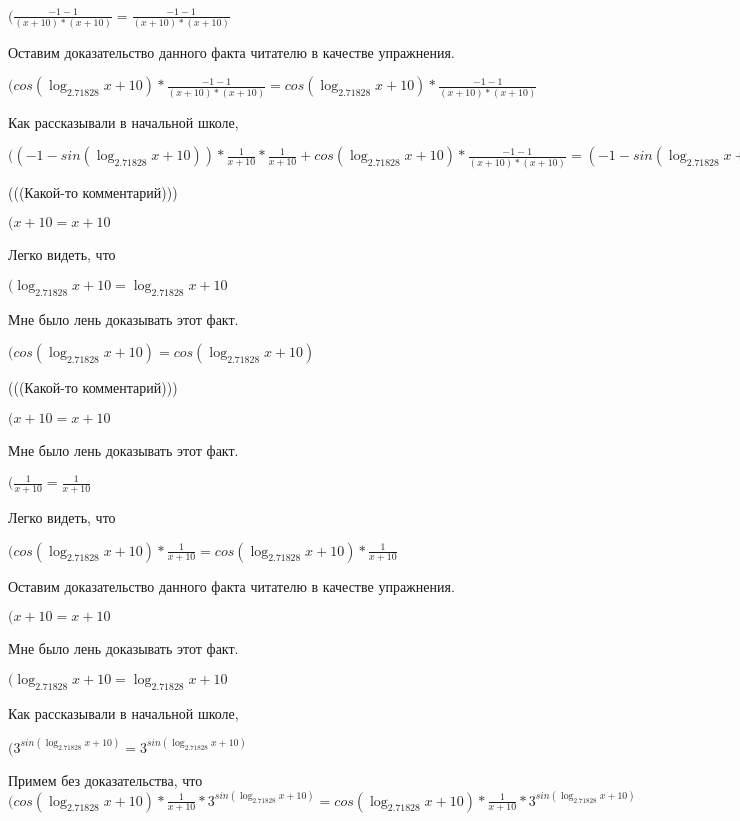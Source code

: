 \documentclass[12pt,a4paper,fleqn]{article}
\theoremstyle{definition}
\begin{document}
$(\frac{ -1  -  1 }{( x  +  10 ) * ( x  +  10 )}
 = \frac{ -1  -  1 }{( x  +  10 ) * ( x  +  10 )}
$

Оставим доказательство данного факта читателю в качестве упражнения.

$(cos(\log_{ 2.71828 }{ x  +  10 }) * \frac{ -1  -  1 }{( x  +  10 ) * ( x  +  10 )}
 = cos(\log_{ 2.71828 }{ x  +  10 }) * \frac{ -1  -  1 }{( x  +  10 ) * ( x  +  10 )}
$

Как рассказывали в начальной школе,

$(( -1  - sin(\log_{ 2.71828 }{ x  +  10 })) * \frac{ 1 }{ x  +  10 }
 * \frac{ 1 }{ x  +  10 }
 + cos(\log_{ 2.71828 }{ x  +  10 }) * \frac{ -1  -  1 }{( x  +  10 ) * ( x  +  10 )}
 = ( -1  - sin(\log_{ 2.71828 }{ x  +  10 })) * \frac{ 1 }{ x  +  10 }
 * \frac{ 1 }{ x  +  10 }
 + cos(\log_{ 2.71828 }{ x  +  10 }) * \frac{ -1  -  1 }{( x  +  10 ) * ( x  +  10 )}
$

(((Какой-то комментарий)))

$( x  +  10  =  x  +  10 $

Легко видеть, что

$(\log_{ 2.71828 }{ x  +  10 } = \log_{ 2.71828 }{ x  +  10 }$

Мне было лень доказывать этот факт.

$(cos(\log_{ 2.71828 }{ x  +  10 }) = cos(\log_{ 2.71828 }{ x  +  10 })$

(((Какой-то комментарий)))

$( x  +  10  =  x  +  10 $

Мне было лень доказывать этот факт.

$(\frac{ 1 }{ x  +  10 }
 = \frac{ 1 }{ x  +  10 }
$

Легко видеть, что

$(cos(\log_{ 2.71828 }{ x  +  10 }) * \frac{ 1 }{ x  +  10 }
 = cos(\log_{ 2.71828 }{ x  +  10 }) * \frac{ 1 }{ x  +  10 }
$

Оставим доказательство данного факта читателю в качестве упражнения.

$( x  +  10  =  x  +  10 $

Мне было лень доказывать этот факт.

$(\log_{ 2.71828 }{ x  +  10 } = \log_{ 2.71828 }{ x  +  10 }$

Как рассказывали в начальной школе,

$({ 3 }^{sin(\log_{ 2.71828 }{ x  +  10 })} = { 3 }^{sin(\log_{ 2.71828 }{ x  +  10 })}$

Примем без доказательства, что
$(cos(\log_{ 2.71828 }{ x  +  10 }) * \frac{ 1 }{ x  +  10 }
 * { 3 }^{sin(\log_{ 2.71828 }{ x  +  10 })} = cos(\log_{ 2.71828 }{ x  +  10 }) * \frac{ 1 }{ x  +  10 }
 * { 3 }^{sin(\log_{ 2.71828 }{ x  +  10 })}$
\end{document}
